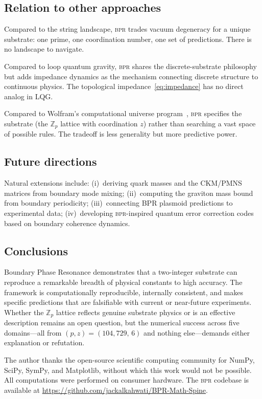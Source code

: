 \documentclass[aps,prd,twocolumn,superscriptaddress,longbibliography,nofootinbib]{revtex4-2}
\newcommand{\Zp}{\mathbb{Z}_p}
\newcommand{\bpr}{\textsc{bpr}}
\begin{document}
\subsection{Relation to other approaches}

Compared to the string landscape, \bpr{} trades vacuum degeneracy
for a unique substrate: one prime, one coordination number, one set
of predictions.  There is no landscape to navigate.

Compared to loop quantum gravity, \bpr{} shares the
discrete-substrate philosophy but adds impedance dynamics as the
mechanism connecting discrete structure to continuous physics.  The
topological impedance~\eqref{eq:impedance} has no direct analog in
LQG.

Compared to Wolfram's computational universe
program~\cite{Wolfram2020}, \bpr{} specifies the substrate (the
$\Zp$ lattice with coordination $z$) rather than searching a vast
space of possible rules.  The tradeoff is less generality but more
predictive power.

\subsection{Future directions}

Natural extensions include: (i)~deriving quark masses and the
CKM/PMNS matrices from boundary mode mixing; (ii)~computing the
graviton mass bound from boundary periodicity; (iii)~connecting BPR
plasmoid predictions to experimental data; (iv)~developing
\bpr{}-inspired quantum error correction codes based on boundary
coherence dynamics.

\subsection{Conclusions}

Boundary Phase Resonance demonstrates that a two-integer substrate
can reproduce a remarkable breadth of physical constants to high
accuracy.  The framework is computationally reproducible, internally
consistent, and makes specific predictions that are falsifiable with
current or near-future experiments.  Whether the $\Zp$ lattice
reflects genuine substrate physics or is an effective description
remains an open question, but the numerical success across five
domains---all from $(p, z) = (104{,}729,\, 6)$ and nothing
else---demands either explanation or refutation.


\begin{acknowledgments}
The author thanks the open-source scientific computing community
for NumPy, SciPy, SymPy, and Matplotlib, without which this work
would not be possible.  All computations were performed on consumer
hardware.  The \bpr{} codebase is available at
\url{https://github.com/jackalkahwati/BPR-Math-Spine}.
\end{acknowledgments}
\end{document}
